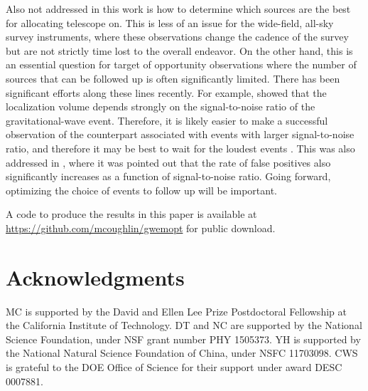 \documentclass[twocolumn]{aastex62}
\begin{document}
Also not addressed in this work is how to determine which sources are the best for allocating telescope on. This is less of an issue for the wide-field, all-sky survey instruments, where these observations change the cadence of the survey but are not strictly time lost to the overall endeavor. On the other hand, this is an essential question for target of opportunity observations where the number of sources that can be followed up is often significantly limited. There has been significant efforts along these lines recently.  For example, \cite{DeBe2018} showed that the localization volume depends strongly on the signal-to-noise ratio of the gravitational-wave event. Therefore, it is likely easier to make a successful observation of the counterpart associated with events with larger signal-to-noise ratio, and therefore it may be best to wait for the loudest events \cite{ChHo2016}. This was also addressed in \cite{LyCo2018}, where it was pointed out that the rate of false positives also significantly increases as a function of signal-to-noise ratio. Going forward, optimizing the choice of events to follow up will be important.

A code to produce the results in this paper is available at 
\url{https://github.com/mcoughlin/gwemopt} for public download.

\section{Acknowledgments}
MC is supported by the David and Ellen Lee Prize Postdoctoral Fellowship at the California Institute of Technology. 
DT and NC are supported by the National Science Foundation, under NSF grant number PHY 1505373.
YH is supported by the National Natural Science Foundation of China, under NSFC 11703098.
CWS is grateful to the DOE Office of Science for their support under award DESC 0007881.



\end{document}
